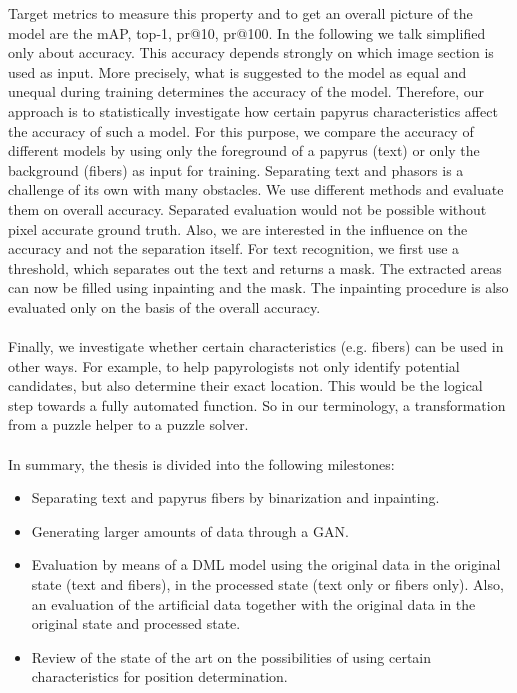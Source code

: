 \documentclass[12pt,a4paper]{article}
\begin{document}
Target metrics to measure this property and to get an overall picture of the model are the mAP, top-1, pr@10, pr@100. In the following we talk simplified only about accuracy. This accuracy depends strongly on which image section is used as input. More precisely, what is suggested to the model as equal and unequal during training determines the accuracy of the model. 
Therefore, our approach is to statistically investigate how certain papyrus characteristics affect the accuracy of such a model. For this purpose, we compare the accuracy of different models by using only the foreground of a papyrus (text) or only the background (fibers) as input for training. Separating text and phasors is a challenge of its own with many obstacles. We use different methods and evaluate them on overall accuracy. Separated evaluation would not be possible without pixel accurate ground truth. Also, we are interested in the influence on the accuracy and not the separation itself. For text recognition, we first use a threshold, which separates out the text and returns a mask. The extracted areas can now be filled using inpainting and the mask. The inpainting procedure is also evaluated only on the basis of the overall accuracy.
\\\\
Finally, we investigate whether certain characteristics (e.g. fibers) can be used in other ways. For example, to help papyrologists not only identify potential candidates, but also determine their exact location. This would be the logical step towards a fully automated function. So in our terminology, a transformation from a puzzle helper to a puzzle solver.   
\\\\
In summary, the thesis is divided into the following milestones:

\begin{itemize}
	\item Separating text and papyrus fibers by binarization and inpainting.
	
	\item Generating larger amounts of data through a GAN.
	
	\item  Evaluation by means of a DML model using the original data in the original state (text and fibers), in the processed state (text only or fibers only). Also, an evaluation of the artificial data together with the original data in the original state and processed state.
	
	\item Review of the state of the art on the possibilities of using certain characteristics for position determination.      	      	      
\end{itemize}
		
\end{document}
